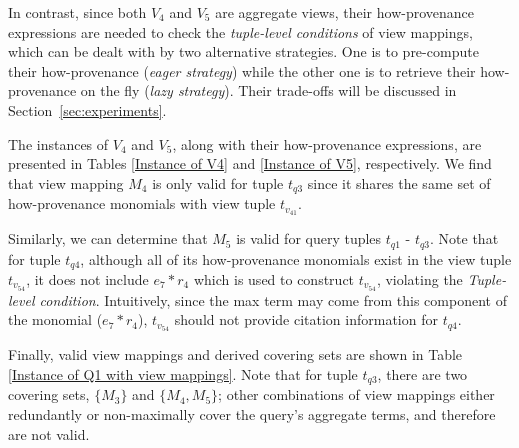 \begin{example}


In contrast, since both $V_4$ and $V_5$ are aggregate views, their how-provenance expressions are needed to check the \textit{tuple-level conditions} of view mappings, which can be dealt with by two alternative strategies. One is to pre-compute their how-provenance ({\em eager strategy}) while the other one is to retrieve their how-provenance on the fly ({\em lazy strategy}). Their trade-offs will be discussed in Section~\ref{sec:experiments}.

The instances of $V_4$ and $V_5$, along with their how-provenance expressions, are presented in Tables \ref{Instance of V4} and  \ref{Instance of V5}, respectively. We find that view mapping $M_4$ is only valid for tuple $t_{q3}$ since it shares the same set of how-provenance monomials with view tuple $t_{v_41}$.

Similarly, we can determine that $M_5$ is valid for query tuples $t_{q1}$ - $t_{q3}$. Note that for tuple $t_{q4}$, although all of its how-provenance monomials exist in the view tuple $t_{v_54}$, it does not include
$e_7*r_4$ which is used to construct $t_{v_54}$, violating the {\em Tuple-level condition}.  Intuitively, since the max term may come from this component of the monomial ($e_7*r_4$), $t_{v_54}$ should not provide citation information for $t_{q4}$.


Finally, valid view mappings and derived covering sets are shown in Table \ref{Instance of Q1 with view mappings}. Note that for tuple $t_{{q}3}$, there are two covering sets, $\{M_3\}$ and $\{M_4, M_5\}$;  
other combinations of view mappings either {redundantly} or {non-maximally} cover the query's aggregate terms, and therefore are not valid.


\end{example}
